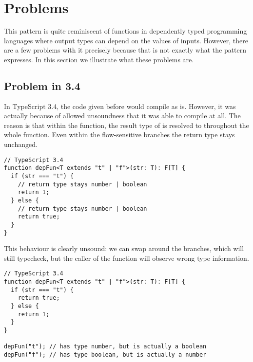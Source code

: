 \section{Problems}
\label{sec:problems}

This pattern is quite reminiscent of functions in dependently typed programming languages where output types can depend on the values of inputs. However, there are a few problems with it precisely because that is not exactly what the pattern expresses. In this section we illustrate what these problems are.

\subsection{Problem in 3.4}

In TypeScript 3.4, the  code given before would compile as is. However, it was actually because of allowed unsoundness that it was able to compile at all. The reason is that within the function, the result type of  is resolved to  throughout the whole function. Even within the flow-sensitive branches the return type stays unchanged.

\begin{lstlisting}
// TypeScript 3.4
function depFun<T extends "t" | "f">(str: T): F[T] {
  if (str === "t") {
    // return type stays number | boolean
    return 1;
  } else {
    // return type stays number | boolean
    return true;
  }
}
\end{lstlisting}

This behaviour is clearly unsound: we can swap around the branches, which will still typecheck, but the caller of the function will observe wrong type information.

\begin{lstlisting}
// TypeScript 3.4
function depFun<T extends "t" | "f">(str: T): F[T] {
  if (str === "t") {
    return true;
  } else {
    return 1;
  }
}

depFun("t"); // has type number, but is actually a boolean
depFun("f"); // has type boolean, but is actually a number
\end{lstlisting}


